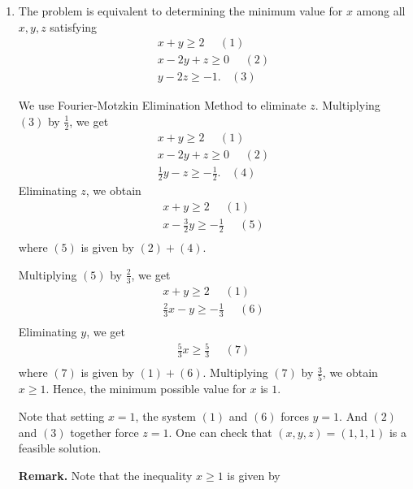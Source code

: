 \documentclass[]{book}
\theoremstyle{definition}
\theoremstyle{definition}
\theoremstyle{remark}
\begin{document}
\begin{enumerate}
\def\labelenumi{\arabic{enumi}.}
\item
  The problem is equivalent to determining the minimum value for \(x\)
  among all \(x,y,z\) satisfying \[
  \begin{array}{r}
   x + y  \geq 2 ~~~~~~(1)\\
   x - 2y + z \geq 0~~~~~~(2) \\
      y - 2z \geq -1.~~~~(3)
  \end{array}
  \]

  We use Fourier-Motzkin Elimination Method to eliminate \(z\).
  Multiplying \((3)\) by \(\frac{1}{2}\), we get \[
  \begin{array}{r}
   x + y  \geq 2 ~~~~~~(1)\\
   x - 2y + z \geq 0~~~~~~(2) \\
      \frac{1}{2}y - z \geq -\frac{1}{2}.~~~~(4)
  \end{array}
  \] Eliminating \(z\), we obtain \[
  \begin{array}{r}
   x + y  \geq 2 ~~~~~~(1)\\
   x - \frac{3}{2}y \geq -\frac{1}{2}~~~~~~(5) \\
  \end{array}
  \] where \((5)\) is given by \((2) + (4)\).

  Multiplying \((5)\) by \(\frac{2}{3}\), we get \[
  \begin{array}{r}
   x + y  \geq 2 ~~~~~~(1)\\
  \frac{2}{3} x - y \geq -\frac{1}{3}~~~~~~(6) \\
  \end{array}
  \] Eliminating \(y\), we get \[
  \begin{array}{r}
  \frac{5}{3} x  \geq \frac{5}{3} ~~~~~~(7)\\
  \end{array}
  \] where \((7)\) is given by \((1) + (6)\). Multiplying \((7)\) by
  \(\frac{3}{5}\), we obtain \(x \geq 1\). Hence, the minimum possible
  value for \(x\) is \(1\).

  Note that setting \(x = 1\), the system \((1)\) and \((6)\) forces
  \(y = 1.\) And \((2)\) and \((3)\) together force \(z = 1.\) One can
  check that \((x,y,z) = (1,1,1)\) is a feasible solution.

  \textbf{Remark.} Note that the inequality \(x \geq 1\) is given by


\end{enumerate}
\end{document}
